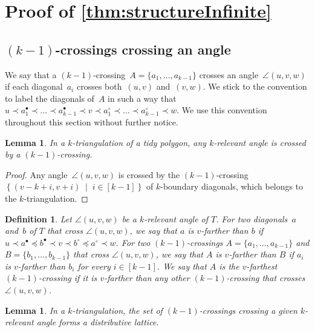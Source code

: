 \documentclass{amsart}
\newtheorem{lemma}[theorem]{Lemma}
\newtheorem{definition}[theorem]{Definition}
\theoremstyle{remark}
\newcommand{\darkblue}{\color{darkblue}} %
\newcommand{\defn}[1]{\textsl{\darkblue #1}} %
\newcommand{\set}[2]{\left\{ #1 \;\middle|\; #2 \right\}} %
\newcommand*{\ktg}[0]{$k$-triangulation\xspace}
\newcommand{\cl}{\prec}
\newcommand{\cle}{\preccurlyeq}
\begin{document}

\section{Proof of \cref{thm:structureInfinite}}
\label{sec:prfInfinite}


\subsection{$(k-1)$-crossings crossing an angle}

We say that a $(k-1)$-crossing~$A = \{a_1, \dots, a_{k-1}\}$ crosses an angle~$\angle(u,v,w)$ if each diagonal~$a_i$ crosses both~$(u,v)$ and~$(v,w)$. We stick to the convention to label the diagonals of~$A$ in such a way that $u \cl a^\bullet_1 \cl \dots \cl a^\bullet_{k-1} \cl v \cl a^\circ_1 \cl \dots \cl a^\circ_{k-1} \cl w$. We use this convention throughout this section without further notice.

\begin{lemma}
\label{lem:tidyExists}
In a \ktg of a tidy polygon, any $k$-relevant angle is crossed by a $(k-1)$-crossing.
\end{lemma}

\begin{proof}
Any angle~$\angle(u,v,w)$ is crossed by the $(k-1)$-crossing~$\set{(v-k+i, v+i)}{i \in [k-1]}$ of $k$-boundary diagonals, which belongs to the \ktg.
\end{proof}

\begin{definition}
Let $\angle(u,v,w)$ be a $k$-relevant angle of $T$.
For two diagonals~$a$ and~$b$ of $T$ that cross $\angle(u,v,w)$, we say that $a$ is \defn{$v$-farther} than $b$ if $u \cl a^\bullet \cle b^\bullet \cl v \cl b^\circ \cle a^\circ \cl w$. For two $(k-1)$-crossings $A = \{a_1, \dots, a_{k-1}\}$ and $B = \{b_1, \dots, b_{k-1}\}$ that cross $\angle(u,v,w)$, we say that $A$ is \defn{$v$-farther} than $B$ if $a_i$ is $v$-farther than $b_i$ for every $i \in [k-1]$. We say that $A$ is the \defn{$v$-farthest} $(k-1)$-crossing if it is $v$-farther than any other $(k-1)$-crossing that crosses~$\angle(u,v,w)$.
\end{definition}

\begin{lemma}
In a \ktg, the set of $(k-1)$-crossings crossing a given $k$-relevant angle forms a distributive lattice.
\end{lemma}
\end{document}
